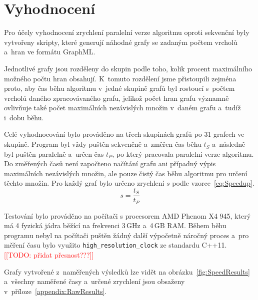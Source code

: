 \documentclass[12pt]{article}
\newcommand{\todo}[1]{\textcolor{red}{[[TODO: #1]]}}
\begin{document}
\section{Vyhodnocení}
Pro účely vyhodnocení zrychlení paralelní verze algoritmu oproti sekvenční byly vytvořeny skripty, které generují náhodné grafy se zadaným počtem vrcholů a~hran ve formátu GraphML. 

Jednotlivé grafy jsou rozděleny do skupin podle toho, kolik procent maximálního možného počtu hran obsahují. K~tomuto rozdělení jsme přistoupili zejména proto, aby čas běhu algoritmu v~jedné skupině grafů byl rostoucí s~počtem vrcholů daného zpracovávaného grafu, jelikož počet hran grafu významně ovlivňuje také počet maximálních nezávislých množin v~daném grafu a~tudíž i~dobu běhu. 

Celé vyhodnocování bylo prováděno na třech skupinách grafů po 31 grafech ve skupině. Program byl vždy puštěn sekvenčně a~změřen čas běhu $t_S$ a~následně byl puštěn paralelně a~určen čas $t_P$, po který pracovala paralelní verze algoritmu. Do změřených časů není započteno načítání grafu ani případný výpis maximálních nezávislých množin, ale pouze čistý čas běhu algoritmu pro určení těchto množin. Pro každý graf bylo určeno zrychlení $s$ podle vzorce~\ref{eq:Speedup}.
\begin{equation}
    s = \frac{t_S}{t_P} \label{eq:Speedup}
\end{equation}

Testování bylo prováděno na počítači s procesorem AMD Phenom X4 945, který má 4 fyzická jádra běžící na frekvenci 3\,GHz a~4\,GB RAM. Během běhu programu nebyl na počítači puštěn žádný další výpočetně náročný proces a~pro měření času bylo využito \texttt{high\_resolution\_clock} ze standardu C++11. \todo{přidat přesnost???}

Grafy vytvořené z~naměřených výsledků lze vidět na obrázku~\ref{fig:SpeedResults} a~všechny naměřené časy a~určené zrychlení jsou obsaženy v~příloze~\ref{appendix:RawResults}.
\end{document}
